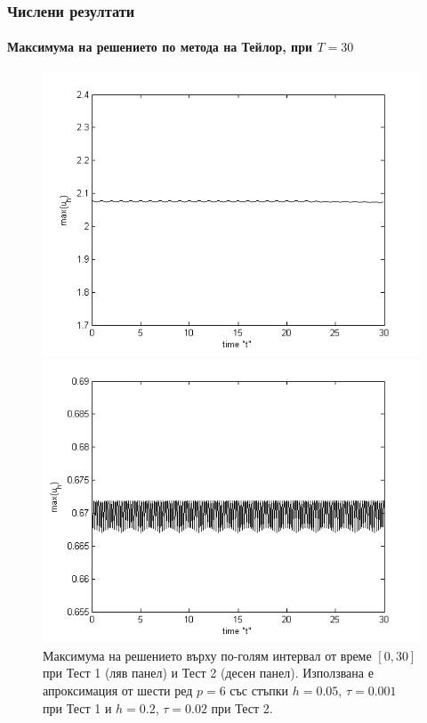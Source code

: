 \documentclass{beamer}
\begin{document}

\begin{frame}
\frametitle{Числени резултати}
\framesubtitle{Максимума на решението по метода на Тейлор, при $T=30$}

\begin{figure}[ht]
	\centering
	\begin{minipage}[b]{0.40\linewidth}
		\includegraphics[width=\linewidth]{../amitans/figures/maximum_30_T30_bt3_c045_h005.png}
	\end{minipage}	
	\begin{minipage}[b]{0.40\linewidth}
		 \includegraphics[width=\linewidth]{../amitans/figures/maximum_30_T30_bt1_c090_h020.png}
	\end{minipage}
\caption{Максимума на решението върху по-голям интервал от време $[0, 30]$ при Тест 1 (ляв панел) и Тест 2 (десен панел). Използвана е апроксимация от шести ред $p=6$ със стъпки $h=0.05$, $\tau = 0.001$ при Тест 1 и $h=0.2$,  $\tau=0.02$ при Тест 2.}
\end{figure}

\end{frame}
\end{document}
